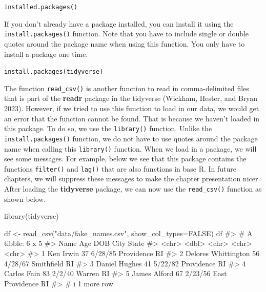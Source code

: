 \documentclass[
  letterpaper,
]{krantz}
\makeatletter
\newenvironment{Shaded}{\begin{snugshade}}{\end{snugshade}}
\newcommand{\AttributeTok}[1]{\textcolor[rgb]{0.40,0.45,0.13}{#1}}
\newcommand{\CommentTok}[1]{\textcolor[rgb]{0.37,0.37,0.37}{#1}}
\newcommand{\ConstantTok}[1]{\textcolor[rgb]{0.56,0.35,0.01}{#1}}
\newcommand{\FunctionTok}[1]{\textcolor[rgb]{0.28,0.35,0.67}{#1}}
\newcommand{\NormalTok}[1]{\textcolor[rgb]{0.00,0.23,0.31}{#1}}
\newcommand{\OtherTok}[1]{\textcolor[rgb]{0.00,0.23,0.31}{#1}}
\newcommand{\StringTok}[1]{\textcolor[rgb]{0.13,0.47,0.30}{#1}}
\newenvironment{kframe}{%
\medskip{}
\setlength{\fboxsep}{.8em}
 \def\at@end@of@kframe{}%
 \ifinner\ifhmode%
  \def\at@end@of@kframe{\end{minipage}}%
  \begin{minipage}{\columnwidth}%
 \fi\fi%
 \def\FrameCommand##1{\hskip\@totalleftmargin \hskip-\fboxsep
 \colorbox{shadecolor}{##1}\hskip-\fboxsep
     \hskip-\linewidth \hskip-\@totalleftmargin \hskip\columnwidth}%
 \MakeFramed {\advance\hsize-\width
   \@totalleftmargin\z@ \linewidth\hsize
   \@setminipage}}%
 {\par\unskip\endMakeFramed%
 \at@end@of@kframe}
\renewenvironment{Shaded}{\begin{kframe}}{\end{kframe}}
\makeatother
\begin{document}
\texttt{installed.packages()}

If you don't already have a package installed, you can install it using
the \texttt{install.packages()} function. Note that you have to include
single or double quotes around the package name when using this
function. You only have to install a package one time.

\texttt{install.packages(\textquotesingle{}tidyverse\textquotesingle{})}

The function \texttt{read\_csv()} is another function to read in
comma-delimited files that is part of the \textbf{readr} package in the
tidyverse (Wickham, Hester, and Bryan 2023). However, if we tried to use
this function to load in our data, we would get an error that the
function cannot be found. That is because we haven't loaded in this
package. To do so, we use the \texttt{library()} function. Unlike the
\texttt{install.packages()} function, we do not have to use quotes
around the package name when calling this \texttt{library()} function.
When we load in a package, we will see some messages. For example, below
we see that this package contains the functions \texttt{filter()} and
\texttt{lag()} that are also functions in base R. In future chapters, we
will suppress these messages to make the chapter presentation nicer.
After loading the \textbf{tidyverse} package, we can now use the
\texttt{read\_csv()} function as shown below.

\begin{Shaded}
\begin{Highlighting}[]
\FunctionTok{library}\NormalTok{(tidyverse)}
\end{Highlighting}
\end{Shaded}

\begin{Shaded}
\begin{Highlighting}[]
\NormalTok{df }\OtherTok{\textless{}{-}} \FunctionTok{read\_csv}\NormalTok{(}\StringTok{"data/fake\_names.csv"}\NormalTok{, }\AttributeTok{show\_col\_types=}\ConstantTok{FALSE}\NormalTok{)}
\NormalTok{df}
\CommentTok{\#\textgreater{} \# A tibble: 6 x 5}
\CommentTok{\#\textgreater{}   Name                  Age DOB     City            State}
\CommentTok{\#\textgreater{}   \textless{}chr\textgreater{}               \textless{}dbl\textgreater{} \textless{}chr\textgreater{}   \textless{}chr\textgreater{}           \textless{}chr\textgreater{}}
\CommentTok{\#\textgreater{} 1 Ken Irwin              37 6/28/85 Providence      RI   }
\CommentTok{\#\textgreater{} 2 Delores Whittington    56 4/28/67 Smithfield      RI   }
\CommentTok{\#\textgreater{} 3 Daniel Hughes          41 5/22/82 Providence      RI   }
\CommentTok{\#\textgreater{} 4 Carlos Fain            83 2/2/40  Warren          RI   }
\CommentTok{\#\textgreater{} 5 James Alford           67 2/23/56 East Providence RI   }
\CommentTok{\#\textgreater{} \# i 1 more row}
\end{Highlighting}
\end{Shaded}
\end{document}
